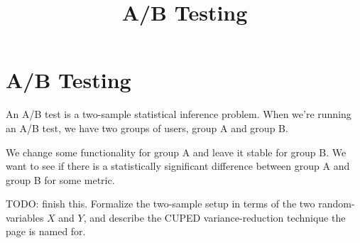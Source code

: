 \documentclass{article}
\title{A/B Testing}
\begin{document}
\section{A/B Testing}

\begin{definition}[A/B Test]
An A/B test is a two-sample statistical inference problem. When we're running an A/B test, we have two groups of users, group A and group B.

We change some functionality for group A and leave it stable for group B. We want to see if there is a statistically significant difference between group A and group B for some metric.

TODO: finish this. Formalize the two-sample setup in terms of the two \@{random-variable}s $X$ and $Y$, and describe the CUPED \@{variance}-reduction technique the page is named for.
\end{definition}
\end{document}

